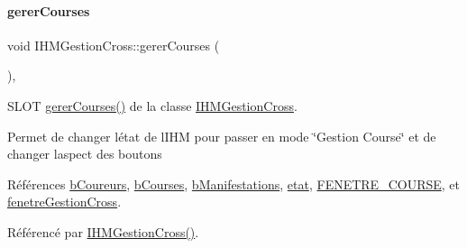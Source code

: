 \paragraph{\texorpdfstring{gerer\+Courses}{gererCourses}}
{\footnotesize\ttfamily void I\+H\+M\+Gestion\+Cross\+::gerer\+Courses (\begin{DoxyParamCaption}{ }\end{DoxyParamCaption})\hspace{0.3cm}{\ttfamily [private]}, {\ttfamily [slot]}}



S\+L\+OT \hyperlink{class_i_h_m_gestion_cross_a82e3861f4959d3599d1d85ee0b3b8654}{gerer\+Courses()} de la classe \hyperlink{class_i_h_m_gestion_cross}{I\+H\+M\+Gestion\+Cross}. 

Permet de changer l\textquotesingle{}état de l\textquotesingle{}I\+HM pour passer en mode \char`\"{}\+Gestion Course\char`\"{} et de changer l\textquotesingle{}aspect des boutons 

Références \hyperlink{class_i_h_m_gestion_cross_ac2819198bae00b7e0f23e8bc491b4cbb}{b\+Coureurs}, \hyperlink{class_i_h_m_gestion_cross_a0df377aec07ada51a115cc458854c966}{b\+Courses}, \hyperlink{class_i_h_m_gestion_cross_a540b4525e546b6d61988245ae53768ce}{b\+Manifestations}, \hyperlink{class_i_h_m_gestion_cross_a5da4390d71dbd5d05cff339f93c7c85a}{etat}, \hyperlink{ihmgestioncross_8h_a33016bbf4e13bffdd4306616fe9d6a0f}{F\+E\+N\+E\+T\+R\+E\+\_\+\+C\+O\+U\+R\+SE}, et \hyperlink{class_i_h_m_gestion_cross_a2ae4807c25f35813507ff0a2abb2ffb3}{fenetre\+Gestion\+Cross}.



Référencé par \hyperlink{class_i_h_m_gestion_cross_a2c62fd83326a87456a403f46acc408c8}{I\+H\+M\+Gestion\+Cross()}.


